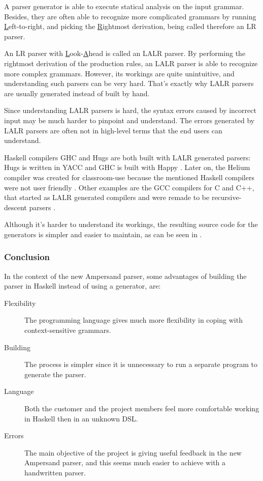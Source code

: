 %
A parser generator is able to execute statical analysis on the input grammar.
Besides, they are often able to recognize more complicated grammars by running \underline{L}eft-to-right, and picking the \underline{R}ightmost derivation, being called therefore an LR parser.

%
An LR parser with \underline{L}ook-\underline{A}head is called an LALR parser.
By performing the rightmost derivation of the production rules, an LALR parser is able to recognize more complex grammars.
However, its workings are quite unintuitive, and understanding such parsers can be very hard.
That's exactly why LALR parsers are usually generated instead of built by hand.

Since understanding LALR parsers is hard, the syntax errors caused by incorrect input may be much harder to pinpoint and understand.
The errors generated by LALR parsers are often not in high-level terms that the end users can understand.

%
%
%
%
%
Haskell compilers GHC and Hugs are both built with LALR generated parsers: Hugs is written in YACC and GHC is built with Happy \cite{hugs-parser,ghc-parser}.
Later on, the Helium compiler was created for classroom-use because the mentioned Haskell compilers were not user friendly \cite{helium-parser}.
Other examples are the GCC compilers for C and C++, that started as LALR generated compilers and were remade to be recursive-descent parsers \cite{gcc-c-parser,gcc-cpp-parser}.

Although it's harder to understand its workings, the resulting source code for the generators is simpler and easier to maintain, as can be seen in \cite{parser-examples}.

\subsubsection{Conclusion}
In the context of the new Ampersand parser, some advantages of building the parser in Haskell instead of using a generator, are:
\begin{description}
	\item[Flexibility] The programming language gives much more flexibility in coping with context-sensitive grammars.
	\item[Building] The process is simpler since it is unnecessary to run a separate program to generate the parser.
	\item[Language] Both the customer and the project members feel more comfortable working in Haskell then in an unknown DSL.
	\item[Errors] The main objective of the project is giving useful feedback in the new Ampersand parser, and this seems much easier to achieve with a handwritten parser.
\end{description}

